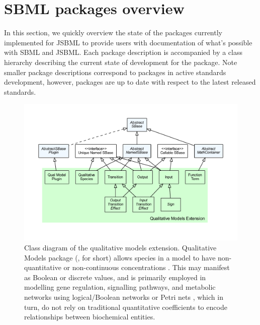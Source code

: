 
\section{SBML packages overview}
\label{sec:extensionsOverview}

In this section, we quickly overview the state of the \SBMLthree packages currently
implemented for JSBML to provide users with documentation of what's possible with SBML and JSBML.
Each package description is accompanied by a 
class hierarchy describing the current state of development for the
package. Note smaller package descriptions correspond to packages in
active standards development, however, packages are up to date
with respect to the latest released standards.

\begin{figure}[hb]
 \centering
 \vspace*{2ex}
 \includegraphics[width=\textwidth]{../../../extensions/qual/doc/img/type_hierarchy.pdf}
 \caption[Class diagram of the qualitative models extension]{Class diagram of the qualitative models extension. Qualitative Models package (, for short) allows species in a model to 
have non-quantitative or non-continuous concentrations \cite{Chaouiya2013}. 
This may manifest as Boolean or discrete values, and is primarily employed in 
modelling gene regulation, signalling pathways, and metabolic networks using 
logical/Boolean networks \cite{shmulevich2002} or Petri nets 
\cite{breitling2008}, which in turn, do not rely on traditional quantitative
coefficients to encode relationships between biochemical entities.}
 \label{fig:qual}
\end{figure}

